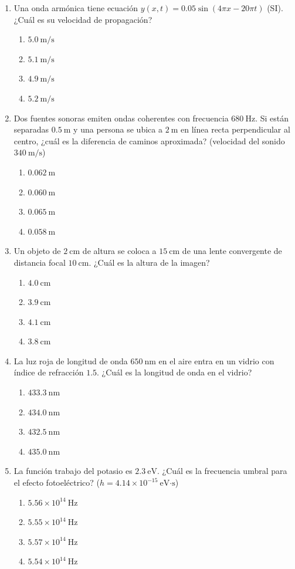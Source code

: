 \documentclass[12pt]{article}
\begin{document}
\begin{enumerate}
\item Una onda armónica tiene ecuación $y(x,t) = 0.05\sin(4\pi x - 20\pi t)$ (SI). ¿Cuál es su velocidad de propagación?
\begin{enumerate}[label=(\alph*)]
\item $5.0\ \text{m/s}$
\item $5.1\ \text{m/s}$
\item $4.9\ \text{m/s}$
\item $5.2\ \text{m/s}$
\end{enumerate}

\item Dos fuentes sonoras emiten ondas coherentes con frecuencia $680\ \text{Hz}$. Si están separadas $0.5\ \text{m}$ y una persona se ubica a $2\ \text{m}$ en línea recta perpendicular al centro, ¿cuál es la diferencia de caminos aproximada? (velocidad del sonido $340\ \text{m/s}$)
\begin{enumerate}[label=(\alph*)]
\item $0.062\ \text{m}$
\item $0.060\ \text{m}$
\item $0.065\ \text{m}$
\item $0.058\ \text{m}$
\end{enumerate}

\item Un objeto de $2\ \text{cm}$ de altura se coloca a $15\ \text{cm}$ de una lente convergente de distancia focal $10\ \text{cm}$. ¿Cuál es la altura de la imagen?
\begin{enumerate}[label=(\alph*)]
\item $4.0\ \text{cm}$
\item $3.9\ \text{cm}$
\item $4.1\ \text{cm}$
\item $3.8\ \text{cm}$
\end{enumerate}

\item La luz roja de longitud de onda $650\ \text{nm}$ en el aire entra en un vidrio con índice de refracción $1.5$. ¿Cuál es la longitud de onda en el vidrio?
\begin{enumerate}[label=(\alph*)]
\item $433.3\ \text{nm}$
\item $434.0\ \text{nm}$
\item $432.5\ \text{nm}$
\item $435.0\ \text{nm}$
\end{enumerate}

\item La función trabajo del potasio es $2.3\ \text{eV}$. ¿Cuál es la frecuencia umbral para el efecto fotoeléctrico? ($h = 4.14\times10^{-15}\ \text{eV·s}$)
\begin{enumerate}[label=(\alph*)]
\item $5.56\times10^{14}\ \text{Hz}$
\item $5.55\times10^{14}\ \text{Hz}$
\item $5.57\times10^{14}\ \text{Hz}$
\item $5.54\times10^{14}\ \text{Hz}$
\end{enumerate}


\end{enumerate}
\end{document}
